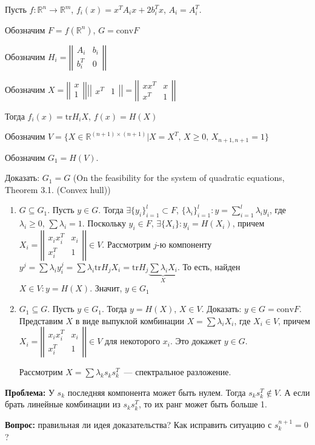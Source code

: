 \documentclass[a4paper]{article}
\date{\today}
\begin{document}
	
Пусть $f\colon \mathbb{R}^n\to\mathbb{R}^m$, $f_i(x)=x^TA_ix+2b_i^Tx$, $A_i=A_i^T$.

Обозначим $F=f(\mathbb{R}^n)$, $G=\mbox{conv}F$

Обозначим $H_i=\left|\left|
\begin{array}{cc}
A_i & b_i\\
b_i^T & 0
\end{array}
\right|\right|$

Обозначим $X=\left|\left|
\begin{array}{cc}
x\\
1
\end{array}
\right|\right|
\left|\left|
\begin{array}{cc}
x^T & 1
\end{array}
\right|\right|=
\left|\left|
\begin{array}{cc}
xx^T & x\\
x^T & 1
\end{array}
\right|\right|$

Тогда $f_i(x)=\mbox{tr} H_iX$, $f(x)=H(X)$

Обозначим $V=\{X\in\mathbb{R}^{(n+1)\times (n+1)}|X=X^T,\,X\geqslant 0,\,X_{n+1,n+1}=1\}$

Обозначим $G_1=H(V)$.

Доказать: $G_1=G$ (On the feasibility for the system of quadratic equations, Theorem 3.1. (Convex hull))

\begin{enumerate}
	\item $G\subseteq G_1$. Пусть $y\in G$. Тогда $\exists \{y_i\}_{i=1}^l\subset F$, $\{\lambda_i\}_{i=1}^l\colon y=\sum\limits_{i=1}^l\lambda_iy_i$, где $\lambda_i\geqslant 0$, $\sum\lambda_i=1$. Поскольку $y_i\in F$, $\exists \{X_i\}\colon y_i=H(X_i)$, причем $X_i=\left|\left|
	\begin{array}{cc}
	x_ix_i^T & x_i\\
	x_i^T & 1
	\end{array}
	\right|\right|\in V$. Рассмотрим $j$-ю компоненту $y^j=\sum \lambda_i y_i^j=\sum \lambda_i \mbox{tr}H_jX_i=\mbox{tr}H_j\underbrace{\sum\lambda_i X_i}_X$. То есть, найден $X\in V\colon y=H(X)$. Значит, $y\in G_1$
	\item $G_1\subseteq G$. Пусть $y\in G_1$. Тогда $y=H(X)$, $X\in V$. Доказать: $y\in G=\mbox{conv}F$. Представим $X$ в виде выпуклой комбинации $X=\sum\lambda_i X_i$, где $X_i\in V$, причем $X_i=\left|\left|
	\begin{array}{cc}
	x_ix_i^T & x_i\\
	x_i^T & 1
	\end{array}
	\right|\right|\in V$ для некоторого $x_i$. Это докажет $y\in G$.
	
	Рассмотрим $X=\sum \lambda_k s_ks_k^T$~--- спектральное разложение.

\end{enumerate}
 
{\bf Проблема:} У $s_k$ последняя компонента может быть нулем. Тогда $s_ks_k^T\not\in V$. А если брать линейные комбинации из $s_ks_k^T$, то их ранг может быть больше 1.
	
{\bf Вопрос:} правильная ли идея доказательства? Как исправить ситуацию с $s_k^{n+1}=0$?
\end{document}
